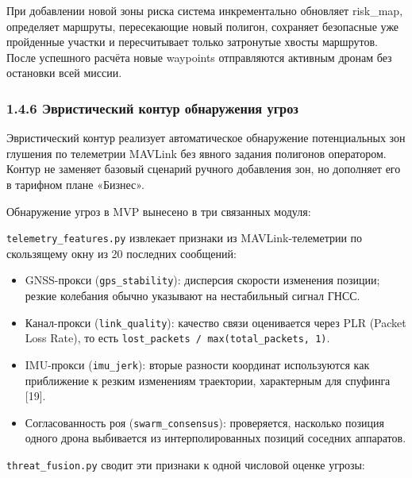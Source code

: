 \documentclass[14pt,a4paper]{extarticle}
\providecommand{\tightlist}{%
  \setlength{\itemsep}{0pt}\setlength{\parskip}{0pt}}
\begin{document}
При добавлении новой зоны риска система инкрементально обновляет risk_map, определяет маршруты, пересекающие новый полигон, сохраняет безопасные уже пройденные участки и пересчитывает только затронутые хвосты маршрутов. После успешного расчёта новые waypoints отправляются активным дронам без остановки всей миссии.


\hypertarget{ux44dux432ux440ux438ux441ux442ux438ux447ux435ux441ux43aux438ux439-ux43aux43eux43dux442ux443ux440-ux43eux431ux43dux430ux440ux443ux436ux435ux43dux438ux44f-ux443ux433ux440ux43eux437}{%
\subsubsection{1.4.6 Эвристический контур обнаружения угроз}\label{ux44dux432ux440ux438ux441ux442ux438ux447ux435ux441ux43aux438ux439-ux43aux43eux43dux442ux443ux440-ux43eux431ux43dux430ux440ux443ux436ux435ux43dux438ux44f-ux443ux433ux440ux43eux437}}

Эвристический контур реализует автоматическое обнаружение потенциальных зон глушения по телеметрии MAVLink без явного задания полигонов оператором. Контур не заменяет базовый сценарий ручного добавления зон, но дополняет его в тарифном плане «Бизнес».

Обнаружение угроз в MVP вынесено в три связанных модуля:

\texttt{telemetry\_features.py} извлекает признаки из MAVLink-телеметрии по скользящему окну из 20 последних сообщений:

\begin{itemize}
\tightlist
\item
  GNSS-прокси (\texttt{gps\_stability}): дисперсия скорости изменения позиции; резкие колебания обычно указывают на нестабильный сигнал ГНСС.
\item
  Канал-прокси (\texttt{link\_quality}): качество связи оценивается через PLR (Packet Loss Rate), то есть \texttt{lost\_packets\ /\ max(total\_packets,\ 1)}.
\item
  IMU-прокси (\texttt{imu\_jerk}): вторые разности координат используются как приближение к резким изменениям траектории, характерным для спуфинга {[}19{]}.
\item
  Согласованность роя (\texttt{swarm\_consensus}): проверяется, насколько позиция одного дрона выбивается из интерполированных позиций соседних аппаратов.
\end{itemize}

\texttt{threat\_fusion.py} сводит эти признаки к одной числовой оценке угрозы:
\end{document}
